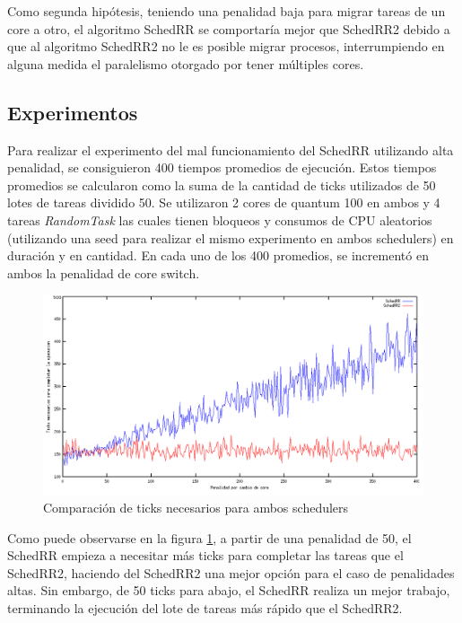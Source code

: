 \documentclass[a4paper,10pt,twoside]{article}
\begin{document}
Como segunda hipótesis, teniendo una penalidad baja para migrar tareas de un core a otro,  el algoritmo SchedRR se comportaría mejor que SchedRR2 debido a que al algoritmo SchedRR2 no le es posible migrar procesos, interrumpiendo en alguna medida el paralelismo otorgado por tener múltiples cores.

\subsection{Experimentos}

Para realizar el experimento del mal funcionamiento del SchedRR utilizando alta penalidad, se consiguieron 400 tiempos promedios de ejecución. Estos tiempos promedios se calcularon como la suma de la cantidad de ticks utilizados de 50 lotes de tareas dividido 50. Se utilizaron 2 cores de quantum 100 en ambos y 4 tareas \textit{RandomTask} las cuales tienen bloqueos y consumos de CPU aleatorios (utilizando una seed para realizar el mismo experimento en ambos schedulers) en duración y en cantidad. En cada uno de los 400 promedios, se incrementó en ambos la penalidad de core switch.

\begin{figure}[ht!]
\centering
\includegraphics[width=175mm]{../ejercicio8/compTicksSched.png}
\caption{Comparación de ticks necesarios para ambos schedulers}
\label{compTicksSched}
\end{figure}

Como puede observarse en la figura \ref{compTicksSched}, a partir de una penalidad de 50, el SchedRR empieza a necesitar más ticks para completar las tareas que el SchedRR2, haciendo del SchedRR2 una mejor opción para el caso de penalidades altas. Sin embargo, de 50 ticks para abajo, el SchedRR realiza un mejor trabajo, terminando la ejecución del lote de tareas más rápido que el SchedRR2.
\end{document}
